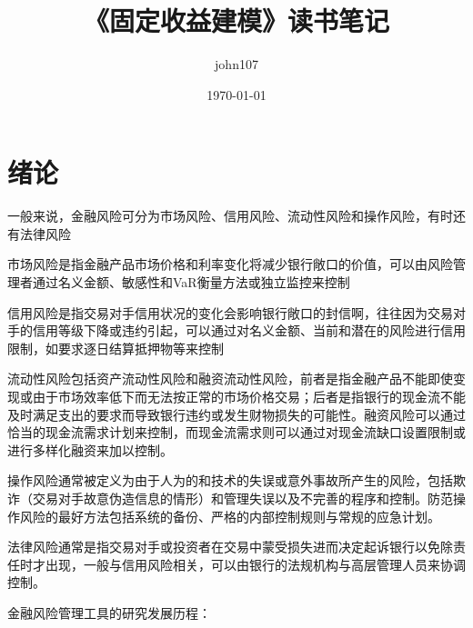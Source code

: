 \documentclass[UTF8]{ctexart}
\title{《固定收益建模》读书笔记}
\author{john107}
\date{\today}
\begin{document}
\maketitle
\clearpage
\tableofcontents
\clearpage

\section{绪论}
一般来说，金融风险可分为市场风险、信用风险、流动性风险和操作风险，有时还有法律风险

市场风险是指金融产品市场价格和利率变化将减少银行敞口的价值，可以由风险管理者通过名义金额、敏感性和VaR衡量方法或独立监控来控制

信用风险是指交易对手信用状况的变化会影响银行敞口的封信啊，往往因为交易对手的信用等级下降或违约引起，可以通过对名义金额、当前和潜在的风险进行信用限制，如要求逐日结算抵押物等来控制

流动性风险包括资产流动性风险和融资流动性风险，前者是指金融产品不能即使变现或由于市场效率低下而无法按正常的市场价格交易；后者是指银行的现金流不能及时满足支出的要求而导致银行违约或发生财物损失的可能性。融资风险可以通过恰当的现金流需求计划来控制，而现金流需求则可以通过对现金流缺口设置限制或进行多样化融资来加以控制。

操作风险通常被定义为由于人为的和技术的失误或意外事故所产生的风险，包括欺诈（交易对手故意伪造信息的情形）和管理失误以及不完善的程序和控制。防范操作风险的最好方法包括系统的备份、严格的内部控制规则与常规的应急计划。

法律风险通常是指交易对手或投资者在交易中蒙受损失进而决定起诉银行以免除责任时才出现，一般与信用风险相关，可以由银行的法规机构与高层管理人员来协调控制。

金融风险管理工具的研究发展历程：
\end{document}
